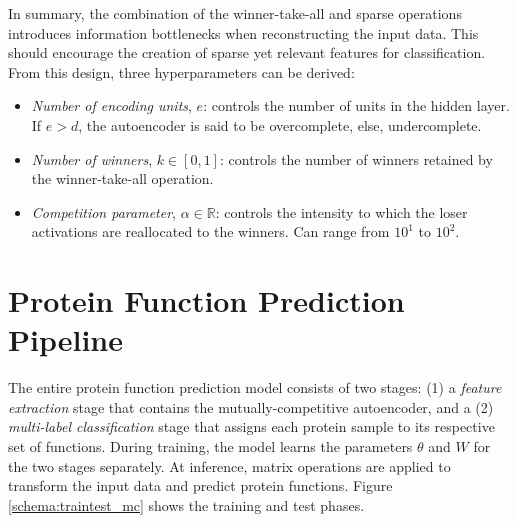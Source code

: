 \par In summary, the combination of the winner-take-all and sparse operations
introduces information bottlenecks when reconstructing the input data. This
should encourage the creation of sparse yet relevant features for
classification. From this design, three hyperparameters can be derived:


\begin{itemize}
  \item \textit{Number of encoding units}, $e$: controls the number of units
  in the hidden layer. If $e > d$, the autoencoder is said to be
  overcomplete, else, undercomplete.
  \item \textit{Number of winners}, $k \in \left[0,1\right]$: controls the
  number of winners retained by the winner-take-all operation.
  \item \textit{Competition parameter}, $\alpha \in \mathbb{R}$: controls the
  intensity to which the loser activations are reallocated to the winners.
  Can range from $10^{1}$ to $10^{2}$.
\end{itemize}

\vspace*{-10pt}


\section{Protein Function Prediction Pipeline}
\label{PFPPipeline}

\par The entire protein function prediction model consists of two stages: (1)
a \textit{feature extraction} stage that contains the mutually-competitive
autoencoder, and a (2) \textit{multi-label classification} stage that assigns
each protein sample to its respective set of functions. During training, the
model learns the parameters $\theta$ and $W$ for the two stages separately.
At inference, matrix operations are applied to transform the input data and
predict protein functions. Figure \ref{schema:traintest_mc} shows the training
and test phases.

